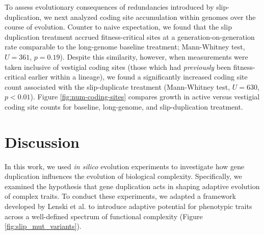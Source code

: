 To assess evolutionary consequences of redundancies introduced by slip-duplication, we next analyzed coding site accumulation within genomes over the course of evolution.
Counter to naive expectation, we found that the slip duplication treatment accrued fitness-critical sites at a generation-on-generation rate comparable to the long-genome baseline treatment; Mann-Whitney test, $U=361$, $p=0.19$).
Despite this similarity, however, when measurements were taken inclusive of vestigial coding sites (those which had \textit{previously} been fitness-critical earlier within a lineage), we found a significantly increased coding site count associated with the slip-duplicate treatment (Mann-Whitney test, $U=630$, $p<0.01$).
Figure \ref{fig:num-coding-sites} compares growth in active versus vestigial coding site counts for baseline, long-genome, and slip-duplication treatment.



\section{Discussion} \label{sec:discussion}

In this work, we used \textit{in silico} evolution experiments to investigate how gene duplication influences the evolution of biological complexity.
Specifically, we examined the hypothesis that gene duplication acts in shaping adaptive evolution of complex traits.
To conduct these experiments, we adapted a framework developed by Lenski et al. \citep{Lenski2003Evolutionary} to introduce adaptive potential for phenotypic traits across a well-defined spectrum of functional complexity (Figure \ref{fig:slip_mut_variants}).

